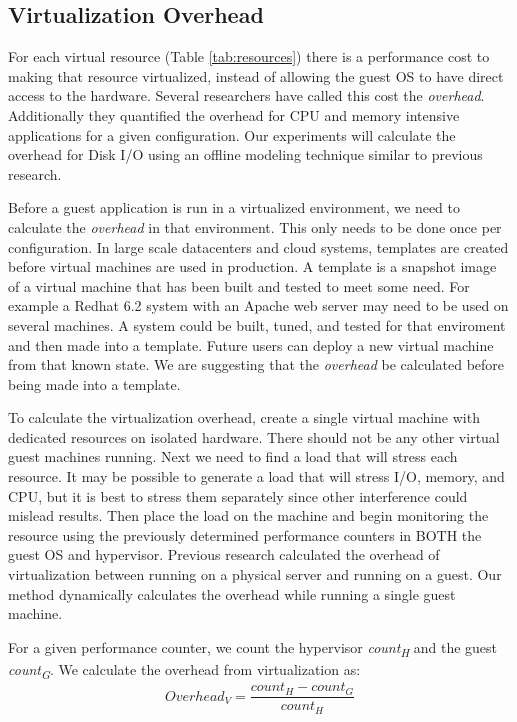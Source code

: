 \subsection{Virtualization Overhead}
For each virtual resource (Table \ref{tab:resources}) there is a performance cost to making that resource virtualized, instead of allowing the guest OS to have direct access to the hardware.  
Several researchers \cite{cherkasova, huber1} have called this cost the \emph{overhead}.  
Additionally they quantified the overhead for CPU and memory intensive applications for a given configuration.  Our experiments will calculate the overhead for Disk I/O using an offline modeling technique similar to previous research.

\indent Before a guest application is run in a virtualized environment, we need to calculate the \emph{overhead} in that environment.  This only needs to be done once per configuration.  In large scale datacenters and cloud systems, templates are created before virtual machines are used in production.  A template is a snapshot image of a virtual machine that has been built and tested to meet some need.  For example a Redhat 6.2 system with an Apache web server may need to be used on several machines.  A system could be built, tuned, and tested for that enviroment and then made into a template.  Future users can deploy a new virtual machine from that known state.  We are suggesting that the \emph{overhead} be calculated before being made into a template.  

\indent To calculate the virtualization overhead, create a single virtual machine with dedicated resources on isolated hardware.  There should not be any other virtual guest machines running.  Next we need to find a load that will stress each resource.  It may be possible to generate a load that will stress I/O, memory, and CPU, but it is best to stress them separately since other interference could mislead results.  Then place the load on the machine and begin monitoring the resource using the previously determined performance counters in BOTH the guest OS and hypervisor. Previous research calculated the overhead of virtualization between running on a physical server and running on a guest.  Our method dynamically calculates the overhead while running a single guest machine.

\indent For a given performance counter, we count the hypervisor \emph{count\textsubscript{H}} and the guest \emph{count\textsubscript{G}}.  We calculate the overhead from virtualization as:
\[ Overhead_V = \frac{count_H - count_G}{count_H} \]


